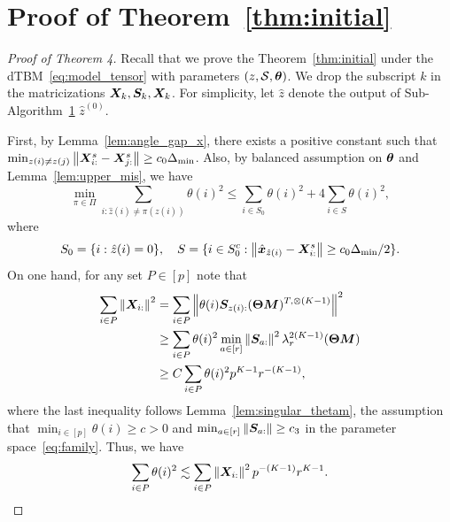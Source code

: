 \documentclass[lettersize,onecolumn,journal]{IEEEtran}
\theoremstyle{definition}
\theoremstyle{definition}
\begin{document}
\section*{Proof of Theorem~\ref{thm:initial}}
\begin{proof}[Proof of Theorem 4] Recall that we prove the Theorem~\ref{thm:initial} under the dTBM~\eqref{eq:model_tensor} with parameters $(z, \mathcal{S}, \boldsymbol{\theta})$. We drop the subscript $k$ in the matricizations $\bm X_k, \bm S_k, \bm X_k$. For simplicity, let $\hat z$ denote the output of Sub-Algorithm~\hyperref[alg:main]{1} $\hat z^{(0)}$.

First, by Lemma~\ref{lem:angle_gap_x}, there exists a positive constant such that $\min_{z(i) \neq z(j)} \left\lVert \bm X^s_{i:} - \bm X^s_{j:} \right\rVert \geq c_0  \Delta_{\min}$. Also, by balanced assumption on $\boldsymbol{\theta}$ and Lemma~\ref{lem:upper_mis}, we have 
 \begin{equation}\label{eq:theta_bound}
          \min_{\pi \in \Pi} \sum_{i : \hat z(i) \neq \pi(z(i))} \theta(i)^2  \leq  \sum_{i \in S_0} \theta(i)^2 + 4 \sum_{i \in S} \theta(i)^2 ,
    \end{equation}
    where 
    \begin{equation}
        S_0 = \{i: \hat z(i) = 0\}, \quad S = \{i \in S_0^c: \left\lVert\hat {\bm x}_{\hat z(i)} - \bm X_{i:}^s \right\rVert \geq c_0  \Delta_{\min}/2\}.
    \end{equation}
    On one hand, for any set $P \in [p]$ note that 
    \begin{align}
        \sum_{i \in P} \left\lVert\bm X_{i:}\right\rVert^2 &= \sum_{i \in P} \left\lVert \theta(i) \bm S_{z(i):} (\boldsymbol{\Theta} \bm M)^{T, \otimes (K-1)} \right\rVert^2 \\
        & \geq \sum_{i \in P} \theta(i)^2 \min_{a \in [r]} \left\lVert\bm S_{a:}\right\rVert^2 \lambda_{r}^{2(K-1)} (\boldsymbol{\Theta} \bm M)\\
        & \geq C \sum_{i \in P} \theta(i)^2 p^{K-1} r^{-(K-1)}, 
    \end{align}
    where the last inequality follows Lemma~\ref{lem:singular_thetam}, the assumption that $\min_{i \in [p]} \theta(i) \geq c >0$ and $\min_{a \in [r]} \left\lVert\bm S_{a:}\right\rVert \geq c_3$ in the parameter space~\eqref{eq:family}. Thus, we have 
    \begin{equation}\label{eq:theta_p}
        \sum_{i \in P} \theta(i)^2 \lesssim \sum_{i \in P} \onorm{\mX_{i:}}^2 p^{-(K-1)} r^{K-1}.
    \end{equation}
    

\end{proof}
\end{document}
